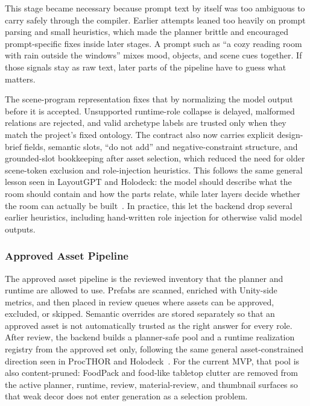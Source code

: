 \documentclass[12pt]{article}
\begin{document}
This stage became necessary because prompt text by itself was too ambiguous to carry safely through the compiler. Earlier attempts leaned too heavily on prompt parsing and small heuristics, which made the planner brittle and encouraged prompt-specific fixes inside later stages. A prompt such as ``a cozy reading room with rain outside the windows'' mixes mood, objects, and scene cues together. If those signals stay as raw text, later parts of the pipeline have to guess what matters.

The scene-program representation fixes that by normalizing the model output before it is accepted. Unsupported runtime-role collapse is delayed, malformed relations are rejected, and valid archetype labels are trusted only when they match the project's fixed ontology. The contract also now carries explicit design-brief fields, semantic slots, ``do not add'' and negative-constraint structure, and grounded-slot bookkeeping after asset selection, which reduced the need for older scene-token exclusion and role-injection heuristics. This follows the same general lesson seen in LayoutGPT and Holodeck: the model should describe what the room should contain and how the parts relate, while later layers decide whether the room can actually be built~\cite{Feng_2023_NeurIPS_LayoutGPT, Yang_2024_CVPR}. In practice, this let the backend drop several earlier heuristics, including hand-written role injection for otherwise valid model outputs.


\subsubsection{Approved Asset Pipeline}
The approved asset pipeline is the reviewed inventory that the planner and runtime are allowed to use. Prefabs are scanned, enriched with Unity-side metrics, and then placed in review queues where assets can be approved, excluded, or skipped. Semantic overrides are stored separately so that an approved asset is not automatically trusted as the right answer for every role. After review, the backend builds a planner-safe pool and a runtime realization registry from the approved set only, following the same general asset-constrained direction seen in ProcTHOR and Holodeck~\cite{Deitke_2022_NeurIPS, Yang_2024_CVPR}. For the current MVP, that pool is also content-pruned: FoodPack and food-like tabletop clutter are removed from the active planner, runtime, review, material-review, and thumbnail surfaces so that weak decor does not enter generation as a selection problem.
\end{document}
